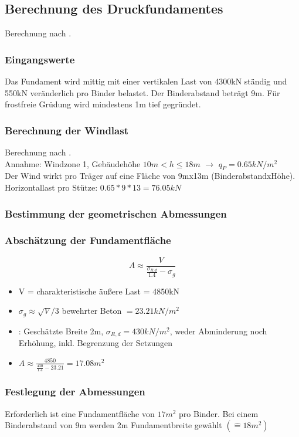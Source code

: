 \documentclass[11pt,fleqn,a4paper,halfparskip]{article}
\begin{document}
\subsection{Berechnung des Druckfundamentes}
Berechnung nach \cite[S.107ff]{wsp}.
\subsubsection{Eingangswerte}
Das Fundament wird mittig mit einer vertikalen Last von 4300kN ständig und 550kN veränderlich pro Binder belastet. Der Binderabstand beträgt 9m. Für frostfreie Grüdung wird mindestens 1m tief gegründet.
\subsubsection*{Berechnung der Windlast}
Berechnung nach \cite[3.25]{schneider}.\\
Annahme: Windzone 1, Gebäudehöhe $10m < h \le 18m$ $\rightarrow$ $q_P = 0.65kN/m^2$\\
Der Wind wirkt pro Träger auf eine Fläche von 9mx13m (BinderabstandxHöhe).\\
Horizontallast pro Stütze: $0.65*9*13 = 76.05kN$


\subsubsection{Bestimmung der geometrischen Abmessungen}
\subsubsection*{Abschätzung der Fundamentfläche}
\begin{equation*}
A \approx \frac{V}{\frac{\sigma_{R.d}}{1.4}-\sigma_g}
\end{equation*}
\begin{itemize}
\item[] V = charakteristische äußere Last = 4850kN
\item[] $\sigma_{g} \approx \sqrt{V}/3$ bewehrter Beton $= 23.21kN/m^2$
\item[] \cite[S.111]{wsp}: Geschätzte Breite 2m, $\sigma_{R,d} = 430kN/m^2$, weder Abminderung noch Erhöhung, inkl. Begrenzung der Setzungen
\item[] $A \approx \frac{4850}{\frac{430}{1.4}-23.21} = 17.08m^2$
\end{itemize}
\subsubsection*{Festlegung der Abmessungen}
Erforderlich ist eine Fundamentfläche von $17m^2$ pro Binder. Bei einem Binderabstand von 9m werden 2m Fundamentbreite gewählt $(\widehat{=}18m^2) $
\end{document}
